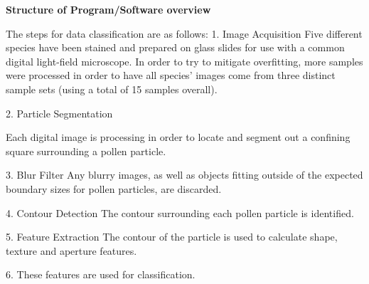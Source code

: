 \textbf{Structure of Program/Software overview} 

The steps for data classification are as follows:
1. Image Acquisition
Five different species have been stained and prepared on glass slides for use with a common digital light-field microscope.  In order to try to mitigate  overfitting, more samples were processed in order to have all species' images come from three distinct sample sets (using a total of 15 samples overall). 

2. Particle Segmentation

Each digital image is processing in order to locate and segment out a confining square surrounding a pollen particle.

3. Blur Filter
Any blurry images, as well as objects fitting outside of the expected boundary sizes for pollen particles, are discarded.

4. Contour Detection
The contour surrounding each pollen particle is identified.

5. Feature Extraction
The contour of the particle is used to calculate shape, texture and aperture features.

6. These features are used for classification.

    
    
    
    
    
    
    
    
    
    
    
    
    
    
    
  
  
  